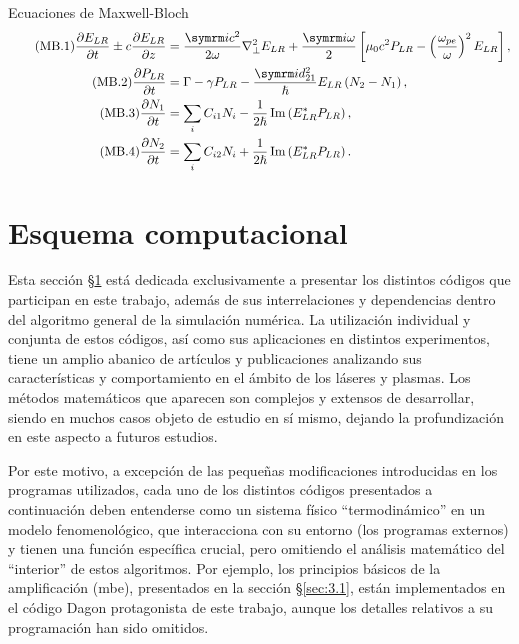 \begin{footheorem*}{Ecuaciones de Maxwell-Bloch}
  \begin{align}
    \tag{MB.1}
    \pdv{E_{LR}}{t} \pm c \pdv{E_{LR}}{z} &= \frac{\iu c^{2}}{2 \omega}\laplacian_{\perp}E_{LR} + \frac{\iu \omega}{2} \left[\mu_{0}c^{2}P_{LR} - \left(\frac{\omega_{pe}}{\omega}\right)^{2}E_{LR}\right], \\
    \tag{MB.2}
    \pdv{P_{LR}}{t} &= \Gamma - \gamma P_{LR} - \frac{\iu d^{2}_{21}}{\hslash }E_{LR}\left(N_{2}-N_{1}\right), \\
    \tag{MB.3}
    \pdv{N_{1}}{t} &= \sum_{i} C_{i1}N_{i} - \frac{1}{2 \hslash }\IM \left(E_{LR}^{*}P_{LR}\right), \\
    \tag{MB.4}
    \pdv{N_{2}}{t} &= \sum_{i} C_{i2}N_{i} + \frac{1}{2 \hslash }\IM \left(E_{LR}^{*}P_{LR}\right).
  \end{align}
\end{footheorem*}

\section{Esquema computacional}\label{sec:3.2}
Esta sección \S\ref{sec:3.2} está dedicada exclusivamente a presentar los distintos códigos que participan en este trabajo, además de sus interrelaciones y dependencias dentro del algoritmo general de la simulación numérica. La utilización individual y conjunta de estos códigos, así como sus aplicaciones en distintos experimentos, tiene un amplio abanico de artículos y publicaciones\autocite{Larroche2000,Almiev2007,Velarde2005,Oliva2009} analizando sus características y comportamiento en el ámbito de los láseres y plasmas. Los métodos matemáticos que aparecen son complejos y extensos de desarrollar, siendo en muchos casos objeto de estudio en sí mismo\autocite{Oliva2010a}, dejando la profundización en este aspecto a futuros estudios.

Por este motivo, a excepción de las pequeñas modificaciones introducidas en los programas utilizados, cada uno de los distintos códigos presentados a continuación deben entenderse como un sistema físico \enquote{termodinámico} en un modelo fenomenológico, que interacciona con su entorno (los programas externos) y tienen una función específica crucial, pero omitiendo el análisis matemático del \enquote{interior} de estos algoritmos. Por ejemplo, los principios básicos de la amplificación (\acrshort{mbe}), presentados en la sección \S\ref{sec:3.1}, están implementados en el código Dagon protagonista de este trabajo, aunque los detalles relativos a su programación han sido omitidos.

